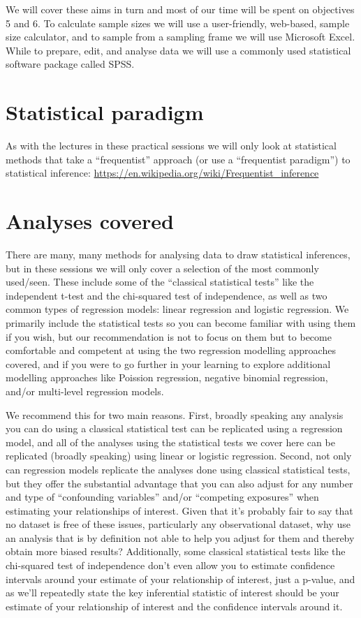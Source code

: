 \documentclass[
]{book}
\begin{document}
We will cover these aims in turn and most of our time will be spent on objectives 5 and 6. To calculate sample sizes we will use a user-friendly, web-based, sample size calculator, and to sample from a sampling frame we will use Microsoft Excel. While to prepare, edit, and analyse data we will use a commonly used statistical software package called SPSS.

\hypertarget{statistical-paradigm}{%
\section{Statistical paradigm}\label{statistical-paradigm}}

As with the lectures in these practical sessions we will only look at statistical methods that take a ``frequentist'' approach (or use a ``frequentist paradigm'') to statistical inference: \url{https://en.wikipedia.org/wiki/Frequentist_inference}

\hypertarget{analyses-covered}{%
\section{Analyses covered}\label{analyses-covered}}

There are many, many methods for analysing data to draw statistical inferences, but in these sessions we will only cover a selection of the most commonly used/seen. These include some of the ``classical statistical tests'' like the independent t-test and the chi-squared test of independence, as well as two common types of regression models: linear regression and logistic regression. We primarily include the statistical tests so you can become familiar with using them if you wish, but our recommendation is not to focus on them but to become comfortable and competent at using the two regression modelling approaches covered, and if you were to go further in your learning to explore additional modelling approaches like Poission regression, negative binomial regression, and/or multi-level regression models.

We recommend this for two main reasons. First, broadly speaking any analysis you can do using a classical statistical test can be replicated using a regression model, and all of the analyses using the statistical tests we cover here can be replicated (broadly speaking) using linear or logistic regression. Second, not only can regression models replicate the analyses done using classical statistical tests, but they offer the substantial advantage that you can also adjust for any number and type of ``confounding variables'' and/or ``competing exposures'' when estimating your relationships of interest. Given that it's probably fair to say that no dataset is free of these issues, particularly any observational dataset, why use an analysis that is by definition not able to help you adjust for them and thereby obtain more biased results? Additionally, some classical statistical tests like the chi-squared test of independence don't even allow you to estimate confidence intervals around your estimate of your relationship of interest, just a p-value, and as we'll repeatedly state the key inferential statistic of interest should be your estimate of your relationship of interest and the confidence intervals around it.
\end{document}

